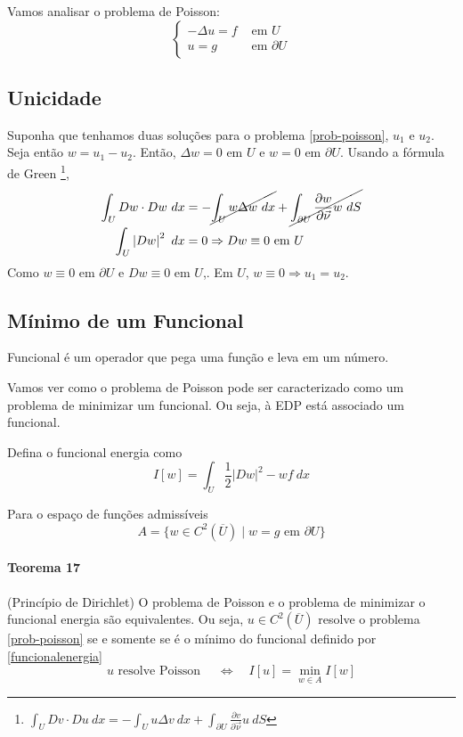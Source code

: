 \documentclass[11pt]{article}
\newcommand{\p}{\partial}
\newcommand{\pde}[2]{\frac{\p #1}{\p #2}}
\newcommand{\dirdev}[1]{\pde{#1}{\vec{\nu}}}
\begin{document}
Vamos analisar o problema de Poisson:
\begin{equation}\label{prob-poisson}
	\begin{cases}
	-\Delta u = f & \text{ em } U\\
	u = g & \text{ em } \p U
\end{cases}
\end{equation}

\subsection{Unicidade}

Suponha que tenhamos duas soluções para o problema \eqref{prob-poisson}, \(u_1\) e \(u_2\). Seja então \(w=u_1-u_2\). Então, \(\Delta w=0\) em \(U\) e \(w=0\) em \(\p U\). Usando a fórmula de Green \footnote{\(\int_U Dv \cdot Du \ dx = -\int_U u \Delta v\ dx + \int_{\partial U} \frac{\partial v}{\partial \vec{\nu}} u \ dS \)}, \begin{align*}\int_U Dw \cdot Dw\ dx  &= - \cancel{\int_U w \Delta w\ dx} + \cancel{\int_{\p U} \dirdev{w} w\ dS} \\
\int_U \left| Dw \right|^2\ dx &= 0 \Rightarrow Dw \equiv 0 \text{ em } U \end{align*}
Como \(w \equiv 0\) em \(\p U\) e \(Dw \equiv 0\) em \(U\),. Em \(U\), \(w\equiv 0 \Rightarrow u_1 = u_2 \).

\subsection{Mínimo de um Funcional}

Funcional é um operador que pega uma função e leva em um número.

Vamos ver como o problema de Poisson pode ser caracterizado como um problema de minimizar um funcional. Ou seja, à EDP está associado um funcional.

Defina o funcional energia como \begin{equation}\label{funcionalenergia}
	I[w]= \int_U \frac{1}{2}\left|D w\right|^2 - wf \ dx
\end{equation}

Para o espaço de funções admissíveis \[A = \{ w \in C^2(\overline{U}) \mid w =g \text{ em } \p U\}\]

\paragraph{Teorema 17} (Princípio de Dirichlet) O problema de Poisson  e o problema de minimizar o funcional energia são equivalentes. Ou seja, \(u \in C^2(\overline{U})\) resolve o problema \eqref{prob-poisson} se e somente se é o mínimo do funcional definido por \eqref{funcionalenergia} \[u \text{ resolve Poisson } \quad \Leftrightarrow \quad I[u] = \min_{w \in A} I[w]\]
\end{document}
